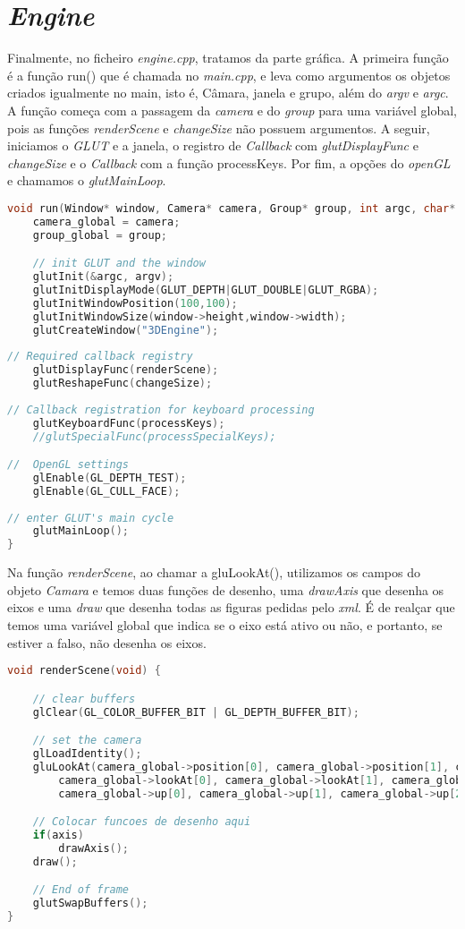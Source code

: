 \documentclass[14pt, a4 paper]{report}
\begin{document}
\section{\textit{Engine}}
Finalmente, no ficheiro \textit{engine.cpp}, tratamos da parte gráfica.
A primeira função é a função run() que é chamada no \textit{main.cpp}, e leva como argumentos os objetos criados igualmente no main, isto é, Câmara, janela e grupo, além do \textit{argv} e \textit{argc}. A função começa com a passagem da \textit{camera} e do \textit{group} para uma variável global, pois as funções \textit{renderScene} e \textit{changeSize} não possuem argumentos. A seguir, iniciamos o \textit{GLUT} e a janela, o registro de \textit{Callback} com \textit{glutDisplayFunc} e \textit{changeSize} e o \textit{Callback} com a função processKeys. Por fim, a opções do \textit{openGL} e chamamos o \textit{glutMainLoop}.
\begin{lstlisting}[language = c++]
void run(Window* window, Camera* camera, Group* group, int argc, char* argv[]) {
    camera_global = camera;
	group_global = group;

	// init GLUT and the window
	glutInit(&argc, argv);
	glutInitDisplayMode(GLUT_DEPTH|GLUT_DOUBLE|GLUT_RGBA);
	glutInitWindowPosition(100,100);
	glutInitWindowSize(window->height,window->width);
	glutCreateWindow("3DEngine");
		
// Required callback registry 
	glutDisplayFunc(renderScene);
	glutReshapeFunc(changeSize);
	
// Callback registration for keyboard processing
	glutKeyboardFunc(processKeys);
	//glutSpecialFunc(processSpecialKeys);

//  OpenGL settings
	glEnable(GL_DEPTH_TEST);
	glEnable(GL_CULL_FACE);
	
// enter GLUT's main cycle
	glutMainLoop();
}
\end{lstlisting}

Na função \textit{renderScene}, ao chamar a gluLookAt(), utilizamos os campos do objeto \textit{Camara} e temos duas funções de desenho, uma \textit{drawAxis} que desenha os eixos e uma \textit{draw} que desenha todas as figuras pedidas pelo \textit{xml}. É de realçar que temos uma variável global que indica se o eixo está ativo ou não, e portanto, se estiver a falso, não desenha os eixos.
\begin{lstlisting}[language = c++]
void renderScene(void) {

	// clear buffers
	glClear(GL_COLOR_BUFFER_BIT | GL_DEPTH_BUFFER_BIT);

	// set the camera
	glLoadIdentity();
	gluLookAt(camera_global->position[0], camera_global->position[1], camera_global->position[2],
		camera_global->lookAt[0], camera_global->lookAt[1], camera_global->lookAt[2],
		camera_global->up[0], camera_global->up[1], camera_global->up[2]);

	// Colocar funcoes de desenho aqui
	if(axis)
		drawAxis();
	draw();

	// End of frame
	glutSwapBuffers();
}
\end{lstlisting}
\end{document}
